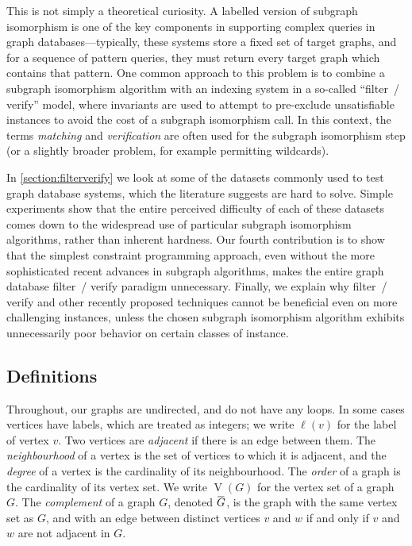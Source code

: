 \documentclass[twoside,11pt]{article}
\newcommand{\shortoverline}[1]{\mkern 1.5mu\overline{\mkern-1.5mu#1\mkern-1.5mu}\mkern 1.5mu}
\begin{document}
This is not simply a theoretical curiosity. A labelled version of subgraph isomorphism is one of
the key components in supporting complex queries in graph databases---typically, these systems store
a fixed set of target graphs, and for a sequence of pattern queries, they must return every target
graph which contains that pattern.  One common approach to this problem is to combine a subgraph
isomorphism algorithm with an indexing system in a so-called ``filter~/ verify'' model, where
invariants are used to attempt to pre-exclude unsatisfiable instances to avoid the cost of a
subgraph isomorphism call. In this context, the terms \emph{matching} and \emph{verification} are
often used for the subgraph isomorphism step (or a slightly broader problem, for example permitting
wildcards).

In \cref{section:filterverify} we look at some of the datasets commonly used to test graph database
systems, which the literature suggests are hard to solve. Simple experiments show that the entire
perceived difficulty of each of these datasets comes down to the widespread use of particular
subgraph isomorphism algorithms, rather than inherent hardness. Our fourth contribution is to show
that the simplest constraint programming approach, even without the more sophisticated recent
advances in subgraph algorithms, makes the entire graph database filter~/ verify paradigm
unnecessary.  Finally, we explain why filter~/ verify and other recently proposed techniques cannot
be beneficial even on more challenging instances, unless the chosen subgraph isomorphism algorithm
exhibits unnecessarily poor behavior on certain classes of instance.

\subsection{Definitions}

Throughout, our graphs are undirected, and do not have any loops. In some cases vertices have
labels, which are treated as integers; we write $\ell(v)$ for the label of vertex $v$. Two vertices
are \emph{adjacent} if there is an edge between them. The \emph{neighbourhood} of a vertex is the
set of vertices to which it is adjacent, and the \emph{degree} of a vertex is the cardinality of its
neighbourhood. The \emph{order} of a graph is the cardinality of its vertex set. We write
$\operatorname{V}(G)$ for the vertex set of a graph $G$. The \emph{complement} of a graph $G$,
denoted $\shortoverline{G}$, is the graph with the same vertex set as $G$, and with an edge between
distinct vertices $v$ and $w$ if and only if $v$ and $w$ are not adjacent in $G$.
\end{document}
